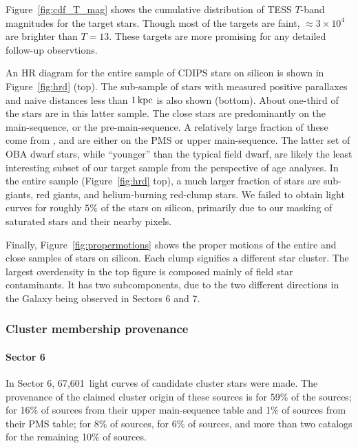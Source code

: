\documentclass[12pt,twocolumn,tighten]{aastex62}
\newcommand{\sVInumberlcs}{67{,}601\ }  %
\begin{document}
Figure~\ref{fig:cdf_T_mag} shows the cumulative distribution of
TESS $T$-band magnitudes for the target stars.
Though most of the targets are faint, $\approx3\times10^4$ are
brighter than $T=13$. These targets are more promising for any
detailed follow-up observtions.

An HR diagram for the entire sample of CDIPS stars on silicon
is shown in Figure~\ref{fig:hrd} (top).
The sub-sample of stars with
measured positive parallaxes and naive distances less than
$1\,{\rm kpc}$ is also shown (bottom).
About one-third of the stars are in this latter sample.
The close stars are predominantly on the main-sequence, or the pre-main-sequence.
A relatively large fraction of these come from \citet{zari_3d_2018},
and are either on the PMS or upper main-sequence.
The latter set of OBA dwarf stars, while ``younger'' than the typical
field dwarf, are likely the least interesting subset of our target sample
from the perspective of age analyses.
In the entire sample (Figure~\ref{fig:hrd} top), a much larger fraction of stars are sub-giants,
red giants, and helium-burning red-clump stars.
We failed to obtain light curves for roughly $5\%$ of the stars on silicon, 
primarily due to our masking of saturated stars and their nearby pixels.

Finally, Figure~\ref{fig:propermotions} shows the proper motions of
the entire and close samples of stars on silicon.  Each clump
signifies a different star cluster. The largest overdensity in the top
figure is composed mainly of field star contaminants. It has two
subcomponents, due to the two different directions in the Galaxy being
observed in Sectors 6 and 7.



\subsubsection{Cluster membership provenance}

\paragraph{Sector 6}
In Sector 6, \sVInumberlcs light curves of candidate cluster stars
were made. The provenance of the claimed cluster origin of these
sources is \citet{dias_proper_2014} for 59\% of the sources;
\citet{zari_3d_2018} for 16\% of sources from their upper
main-sequence table and 1\% of sources from their PMS table;
\citet{Kharchenko_et_al_2013} for 8\% of sources,
\citet{cantat-gaudin_gaia_2018} for 6\% of sources, and more than two
catalogs for the remaining 10\% of sources.
\end{document}
